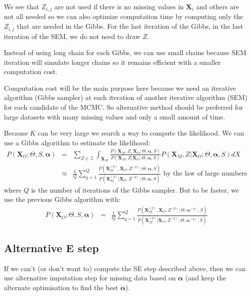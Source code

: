 \documentclass[12pt,a4paper]{report}
\begin{document}
	
	
	We see that $Z_{i,j}$ are not used if there is no missing values in $\boldsymbol{X}_i$ and others are not all needed so we can also optimize computation time by  computing only the $Z_{i,j}$ that are needed in the Gibbs.
	For the last iteration of the Gibbs, in the last iteration of the SEM, we do not need to draw $Z$.	
	
	Instead of using long chain for each Gibbs, we can use small chains because SEM iteration will simulate longer chains so it remains efficient with a smaller computation cost.
	
	Computation cost will be the main purpose here because we need an iterative algorithm (Gibbs sampler) at each iteration of another iterative algorithm (SEM) for each candidate of the MCMC.
	So alternative method should be preferred for large datasets with many missing values and only a small amount of time.
	
	Because $K$ can be very large we search a way to compute the likelihood.
	We can use a Gibbs algorithm to estimate the likelihood:
	\begin{eqnarray}
	P(\boldsymbol{X}_O;\Theta, S, \boldsymbol{\alpha})&=& 
		\sum_{Z\in \mathcal{Z}}\int_{\boldsymbol{X}_M}\frac{P(\boldsymbol{X}_M,Z,\boldsymbol{X}_O;\Theta,\boldsymbol{\alpha},S)}{P(\boldsymbol{X}_M,Z|\boldsymbol{X}_O;\Theta,\boldsymbol{\alpha},S)}P(\boldsymbol{X}_M,Z|\boldsymbol{X}_O;\Theta,\boldsymbol{\alpha},S) dX \\
		&\approx &\frac{1}{Q} \sum_{q=1}^Q\frac{P(\boldsymbol{X}_M^{(q)},\boldsymbol{X}_O,Z^{(q)};\Theta,\boldsymbol{\alpha},S)}{P(\boldsymbol{X}_M^{(q)}|\boldsymbol{X}_O,Z^{(q)};\Theta,\boldsymbol{\alpha},S)} \textrm{ by the law of large numbers}
	\end{eqnarray}		
	where $Q$ is the number of iterations of the Gibbs sampler.
	But to be faster, we use the previous Gibbs algorithm with:
	\begin{eqnarray}
	P(\boldsymbol{X}_O;\Theta, S, \boldsymbol{\alpha})&=& \frac{1}{Q} \sum_{q=1}^Q\frac{P(\boldsymbol{X}_M^{(q)},\boldsymbol{X}_O,Z^{(q)};\Theta,\boldsymbol{\alpha}^{(q)},S)}{P(\boldsymbol{X}_M^{(q)}|\boldsymbol{X}_O,Z^{(q)};\Theta,\boldsymbol{\alpha}^{(q)},S)}
	\end{eqnarray}	
		
\subsection{Alternative E step}
	If we can't (or don't want to) compute the SE step described above, then we can use alternative imputation step for missing data based on $\boldsymbol{\alpha}$ (and keep the alternate optimisation to find the best $\boldsymbol{\alpha}$). 
	
\end{document}

